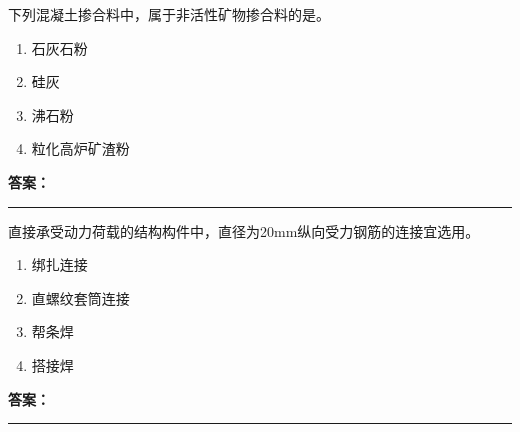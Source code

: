 \documentclass[UTF8,fontset=fandol,11pt]{ctexart}
\newcommand{\answerline}{\textcolor{answerred}{\rule{2.4cm}{0.7pt}}}
\begin{document}
\begin{quizbox}[title={乱序第 185 题｜第四章混凝土结构工程}]

下列混凝土掺合料中，属于非活性矿物掺合料的是。\\

\begin{enumerate}[label=\Alph*.]

\item 石灰石粉

\item 硅灰

\item 沸石粉

\item 粒化高炉矿渣粉

\end{enumerate}

\textbf{\textcolor{answerred}{答案：}} \answerline

\end{quizbox}

\vspace{0.2em}

\begin{quizbox}[title={乱序第 186 题｜第四章混凝土结构工程}]

直接承受动力荷载的结构构件中，直径为20mm纵向受力钢筋的连接宜选用。\\

\begin{enumerate}[label=\Alph*.]

\item 绑扎连接

\item 直螺纹套筒连接

\item 帮条焊

\item 搭接焊

\end{enumerate}

\textbf{\textcolor{answerred}{答案：}} \answerline

\end{quizbox}

\vspace{0.2em}
\end{document}
